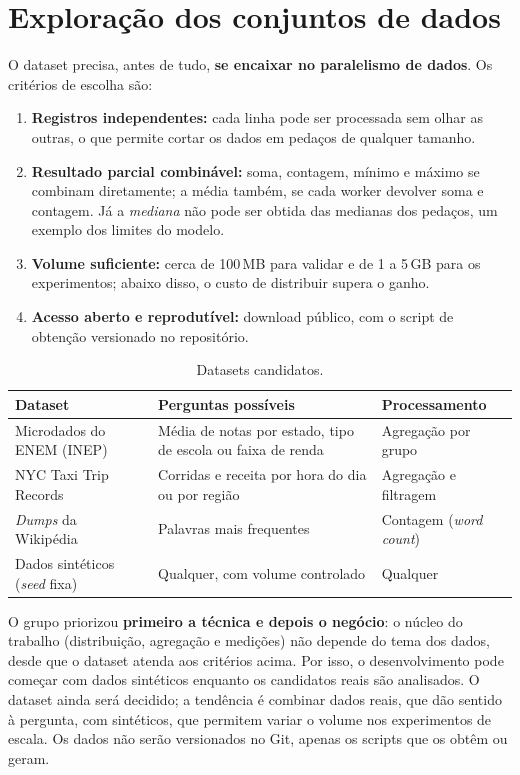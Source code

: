 \section{Exploração dos conjuntos de dados}
\label{sec:datasets}

O dataset precisa, antes de tudo, \textbf{se encaixar no paralelismo de
dados}. Os critérios de escolha são:

\begin{enumerate}
  \item \textbf{Registros independentes:} cada linha pode ser processada
    sem olhar as outras, o que permite cortar os dados em pedaços de
    qualquer tamanho.
  \item \textbf{Resultado parcial combinável:} soma, contagem, mínimo e
    máximo se combinam diretamente; a média também, se cada worker devolver
    soma e contagem. Já a \emph{mediana} não pode ser obtida das medianas
    dos pedaços, um exemplo dos limites do modelo.
  \item \textbf{Volume suficiente:} cerca de 100\,MB para validar e de 1 a
    5\,GB para os experimentos; abaixo disso, o custo de distribuir supera
    o ganho.
  \item \textbf{Acesso aberto e reprodutível:} download público, com o
    script de obtenção versionado no repositório.
\end{enumerate}

\begin{table}[H]
  \centering
  \small
  \begin{tabularx}{\textwidth}{>{\raggedright}p{2.8cm}X>{\raggedright\arraybackslash}p{3cm}}
    \toprule
    \textbf{Dataset} & \textbf{Perguntas possíveis} & \textbf{Processamento} \\
    \midrule
    Microdados do ENEM (INEP)~\cite{enem} &
      Média de notas por estado, tipo de escola ou faixa de renda &
      Agregação por grupo \\
    NYC Taxi Trip Records~\cite{nyctaxi} &
      Corridas e receita por hora do dia ou por região &
      Agregação e filtragem \\
    \emph{Dumps} da Wikipédia &
      Palavras mais frequentes &
      Contagem (\emph{word count}) \\
    Dados sintéticos (\emph{seed} fixa) &
      Qualquer, com volume controlado &
      Qualquer \\
    \bottomrule
  \end{tabularx}
  \caption{Datasets candidatos.}
\end{table}

O grupo priorizou \textbf{primeiro a técnica e depois o negócio}: o núcleo
do trabalho (distribuição, agregação e medições) não depende do tema dos
dados, desde que o dataset atenda aos critérios acima. Por isso, o
desenvolvimento pode começar com dados sintéticos enquanto os candidatos
reais são analisados. O dataset ainda será decidido; a tendência é
combinar dados reais, que dão sentido à pergunta, com sintéticos, que
permitem variar o volume nos experimentos de escala. Os dados não serão
versionados no Git, apenas os scripts que os obtêm ou geram.
